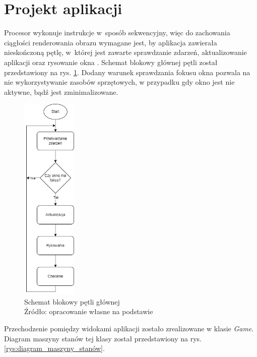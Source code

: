 \documentclass[12pt,a4paper]{article} %
\begin{document}

\clearpage
\section{Projekt aplikacji}
\aka Procesor wykonuje instrukcje w~sposób sekwencyjny, więc do zachowania ciągłości renderowania obrazu wymagane jest, by aplikacja zawierała nieskończoną pętlę, w~której jest zawarte sprawdzanie zdarzeń, aktualizowanie aplikacji oraz rysowanie okna \cite{gameprogrammingpatterns}. Schemat blokowy głównej pętli został przedstawiony na rys. \ref{rys:main_loop}. Dodany warunek sprawdzania fokusu okna pozwala na nie wykorzystywanie zasobów sprzętowych, w przypadku gdy okno jest nie aktywne, bądź jest zminimalizowane.

\begin{figure}[h]
	\centering
	\includegraphics[height=10cm]{images/main_loop.png}
	\caption{Schemat blokowy pętli głównej \\ Źródło: opracowanie własne na podstawie \cite{gameprogrammingpatterns}}
	\label{rys:main_loop}
\end{figure}


\aka Przechodzenie pomiędzy widokami aplikacji zostało zrealizowane w klasie \textit{Game}. Diagram maszyny stanów tej klasy został przedstawiony na rys. \ref{rys:diagram_maszyny_stanów}.
\end{document}
